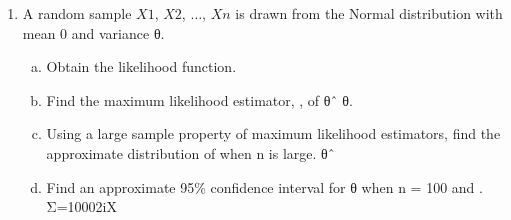 \begin{enumerate}
\item  A random sample $X1$, $X2$, $\ldots$, $Xn$ is drawn from the Normal distribution with mean 0 and variance θ.
\begin{enumerate}[(a)]
\item Obtain the likelihood function.
\item Find the maximum likelihood estimator, , of θˆ θ.
\item  Using a large sample property of maximum likelihood estimators, find the approximate distribution of when n is large. θˆ
\item Find an approximate 95\% confidence interval for θ when n = 100 and . Σ=10002iX
\end{enumerate}

\end{enumerate}
